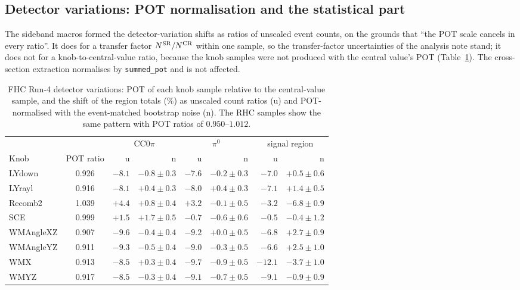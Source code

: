 \documentclass[11pt,a4paper]{article}
\begin{document}
\subsection{Detector variations: POT normalisation and the statistical part}
\label{sec:detvar_pot}

The sideband macros formed the detector-variation shifts as ratios of unscaled event counts, on the grounds that
``the POT scale cancels in every ratio''. It does for a transfer factor $N^{\rm SR}/N^{\rm CR}$ within one sample,
so the transfer-factor uncertainties of the analysis note stand; it does not for a knob-to-central-value ratio,
because the knob samples were not produced with the central value's POT (Table~\ref{tab:detvar}). The
cross-section extraction normalises by \texttt{summed\_pot} and is not affected.

\begin{table}[H]
  \centering
  \caption{FHC Run-4 detector variations: POT of each knob sample relative to the central-value sample, and the
    shift of the region totals (\%) as unscaled count ratios (u) and POT-normalised with the event-matched
    bootstrap noise (n). The RHC samples show the same pattern with POT ratios of $0.950$--$1.012$.}
  \label{tab:detvar}
  \small
  \begin{tabular}{lcrrrrrr}
    \toprule
    & & \multicolumn{2}{c}{CC$0\pi$} & \multicolumn{2}{c}{$\pi^0$} & \multicolumn{2}{c}{signal region} \\
    Knob & POT ratio & u & n & u & n & u & n \\
    \midrule
    LYdown    & 0.926 & $-8.1$ & $-0.8\pm0.3$ & $-7.6$ & $-0.2\pm0.3$ & $-7.0$ & $+0.5\pm0.6$ \\
    LYrayl    & 0.916 & $-8.1$ & $+0.4\pm0.3$ & $-8.0$ & $+0.4\pm0.3$ & $-7.1$ & $+1.4\pm0.5$ \\
    Recomb2   & 1.039 & $+4.4$ & $+0.8\pm0.4$ & $+3.2$ & $-0.1\pm0.5$ & $-3.2$ & $-6.8\pm0.9$ \\
    SCE       & 0.999 & $+1.5$ & $+1.7\pm0.5$ & $-0.7$ & $-0.6\pm0.6$ & $-0.5$ & $-0.4\pm1.2$ \\
    WMAngleXZ & 0.907 & $-9.6$ & $-0.4\pm0.4$ & $-9.2$ & $+0.0\pm0.5$ & $-6.8$ & $+2.7\pm0.9$ \\
    WMAngleYZ & 0.911 & $-9.3$ & $-0.5\pm0.4$ & $-9.0$ & $-0.3\pm0.5$ & $-6.6$ & $+2.5\pm1.0$ \\
    WMX       & 0.913 & $-8.5$ & $+0.3\pm0.4$ & $-9.7$ & $-0.9\pm0.5$ & $-12.1$ & $-3.7\pm1.0$ \\
    WMYZ      & 0.917 & $-8.5$ & $-0.3\pm0.4$ & $-9.1$ & $-0.7\pm0.5$ & $-9.1$ & $-0.9\pm0.9$ \\
    \bottomrule
  \end{tabular}
\end{table}
\end{document}
